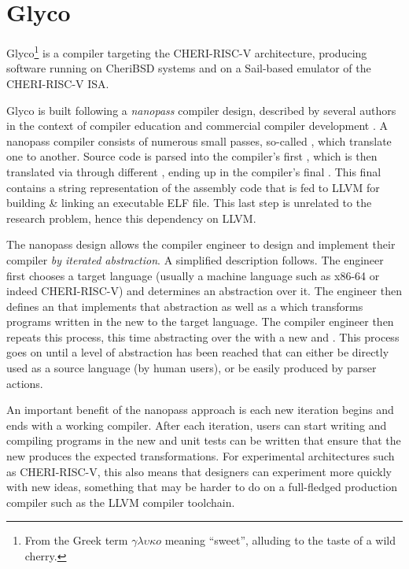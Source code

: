 \documentclass[main.tex]{subfiles}
\begin{document}
\onlyinsubfile{\mainmatter{}}

\chapter{Glyco}

Glyco\footnote{From the Greek term $\gamma\lambda\upsilon\kappa{}o$ meaning \enquote{sweet}, alluding to the taste of a wild cherry.} is a compiler targeting the CHERI-RISC-V architecture, producing software running on CheriBSD systems and on a Sail-based emulator of the CHERI-RISC-V ISA.

Glyco is built following a \emph{nanopass} compiler design, described by several authors in the context of compiler education \cite{:educomp} and commercial compiler development \cite{:commcomp}. A nanopass compiler consists of numerous small passes, so-called \emph{\nanopasses{}}, which translate one \emph{\il{}} to another. Source code is parsed into the compiler’s first \il{}, which is then translated via \nanopasses{} through different \ils{}, ending up in the compiler's final \il{}. This final \il{} contains a string representation of the assembly code that is fed to LLVM for building \& linking an executable ELF file. This last step is unrelated to the research problem, hence this dependency on LLVM.

The nanopass design allows the compiler engineer to design and implement their compiler \emph{by iterated abstraction}. A simplified description follows. The engineer first chooses a target language (usually a machine language such as x86-64 or indeed CHERI-RISC-V) and determines an abstraction over it. The engineer then defines an \il{} that implements that abstraction as well as a \nanopass{} which transforms programs written in the new \il{} to the target language. The compiler engineer then repeats this process, this time abstracting over the \il{} with a new \il{} and \nanopass{}. This process goes on until a level of abstraction has been reached that can either be directly used as a source language (by human users), or be easily produced by parser actions.

An important benefit of the nanopass approach is each new iteration begins and ends with a working compiler. After each iteration, users can start writing and compiling programs in the new \il{} and unit tests can be written that ensure that the new \nanopass{} produces the expected transformations. For experimental architectures such as CHERI-RISC-V, this also means that designers can experiment more quickly with new ideas, something that may be harder to do on a full-fledged production compiler such as the LLVM compiler toolchain.
\end{document}
